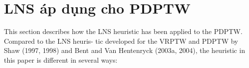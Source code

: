 
\chapter{LNS áp dụng cho PDPTW}
This section describes how the LNS heuristic has been applied to the PDPTW. Compared to the LNS heuris- tic developed for the VRPTW and PDPTW by Shaw (1997, 1998) and Bent and Van Hentenryck (2003a, 2004), the heuristic in this paper is different in several ways:









